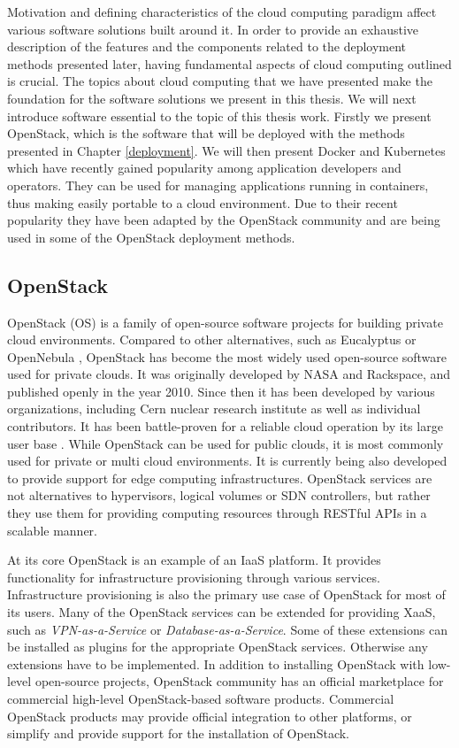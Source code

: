 Motivation and defining characteristics of the cloud computing paradigm affect
various software solutions built around it. In order to provide an exhaustive
description of the features and the components related to the deployment
methods presented later, having fundamental aspects of cloud computing outlined
is crucial. The topics about cloud computing that we have presented make the
foundation for the software solutions we present in this thesis. We will next
introduce software essential to the topic of this thesis work. Firstly we
present OpenStack, which is the software that will be deployed with the methods
presented in Chapter \ref{deployment}. We will then present Docker and
Kubernetes which have recently gained popularity among application developers
and operators. They can be used for managing applications running in
containers, thus making easily portable to a cloud environment. Due to their
recent popularity they have been adapted by the OpenStack community and are
being used in some of the OpenStack deployment methods.

\subsection{OpenStack} \label{openstack}

OpenStack (OS) \cite{sefraoui2012openstack} is a family of open-source software
projects for building private cloud environments. Compared to other
alternatives, such as Eucalyptus \cite{eucalyptus} or OpenNebula
\cite{opennebula}, OpenStack has become the most widely used open-source
software used for private clouds. It was originally developed by NASA and
Rackspace, and published openly in the year 2010. Since then it has been
developed by various organizations, including Cern nuclear research institute
as well as individual contributors. It has been battle-proven for a reliable
cloud operation by its large user base \cite{miller2015brief}. While OpenStack
can be used for public clouds, it is most commonly used for private or multi
cloud environments. It is currently being also developed to provide support for
edge computing infrastructures. OpenStack services are not alternatives to
hypervisors, logical volumes or SDN controllers, but rather they use them for
providing computing resources through RESTful APIs in a scalable manner.

At its core OpenStack is an example of an IaaS platform. It provides
functionality for infrastructure provisioning through various services.
Infrastructure provisioning is also the primary use case of OpenStack for most
of its users. Many of the OpenStack services can be extended for providing
XaaS, such as \textit{VPN-as-a-Service} or \textit{Database-as-a-Service}. Some
of these extensions can be installed as plugins for the appropriate OpenStack
services. Otherwise any extensions have to be implemented. In addition to
installing OpenStack with low-level open-source projects, OpenStack community
has an official marketplace for commercial high-level OpenStack-based software
products. Commercial OpenStack products may provide official integration to
other platforms, or simplify and provide support for the installation of
OpenStack.

